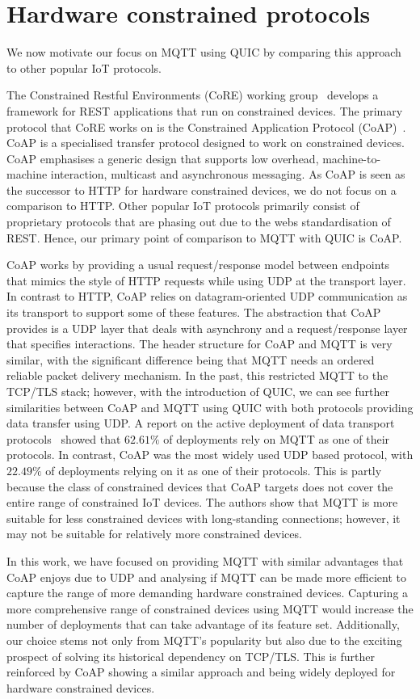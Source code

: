 \section{Hardware constrained protocols} \label{sec:iot-protos}

We now motivate our focus on MQTT using QUIC by comparing this approach to other popular IoT protocols.

The Constrained Restful Environments (CoRE) working group~\citep{core_wg} develops a framework for REST applications that run on constrained devices.
The primary protocol that CoRE works on is the Constrained Application Protocol (CoAP)~\citep{Shelby2014}.
CoAP is a specialised transfer protocol designed to work on constrained devices.
CoAP emphasises a generic design that supports low overhead, machine-to-machine interaction, multicast and asynchronous messaging.
As CoAP is seen as the successor to HTTP for hardware constrained devices, we do not focus on a comparison to HTTP.
Other popular IoT protocols primarily consist of proprietary protocols that are phasing out due to the webs standardisation of REST.
Hence, our primary point of comparison to MQTT with QUIC is CoAP.

CoAP works by providing a usual request/response model between endpoints that mimics the style of HTTP requests while using UDP at the transport layer.
In contrast to HTTP, CoAP relies on datagram-oriented UDP communication as its transport to support some of these features.
The abstraction that CoAP provides is a UDP layer that deals with asynchrony and a request/response layer that specifies interactions.
The header structure for CoAP and MQTT is very similar, with the significant difference being that MQTT needs an ordered reliable packet delivery mechanism.
In the past, this restricted MQTT to the TCP/TLS stack; however, with the introduction of QUIC, we can see further similarities between CoAP and MQTT using QUIC with both protocols providing data transfer using UDP.
A report on the active deployment of data transport protocols~\cite{tmobile_iot} showed that $62.61\%$ of deployments rely on MQTT as one of their protocols.
In contrast, CoAP was the most widely used UDP based protocol, with $22.49\%$ of deployments relying on it as one of their protocols.
This is partly because the class of constrained devices that CoAP targets does not cover the entire range of constrained IoT devices.
The authors show that MQTT is more suitable for less constrained devices with long-standing connections; however, it may not be suitable for relatively more constrained devices.

In this work, we have focused on providing MQTT with similar advantages that CoAP enjoys due to UDP and analysing if MQTT can be made more efficient to capture the range of more demanding hardware constrained devices.
Capturing a more comprehensive range of constrained devices using MQTT would increase the number of deployments that can take advantage of its feature set.
Additionally, our choice stems not only from MQTT's popularity but also due to the exciting prospect of solving its historical dependency on TCP/TLS.
This is further reinforced by CoAP showing a similar approach and being widely deployed for hardware constrained devices.
